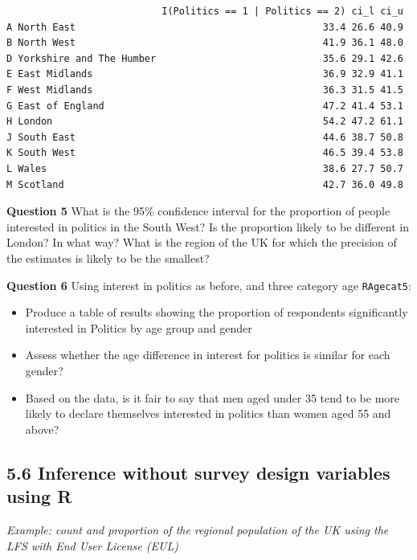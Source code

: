 \documentclass[
  14,
  a4paper,
  DIV=11,
  numbers=noendperiod]{scrartcl}
\begin{document}
\begin{verbatim}
                           I(Politics == 1 | Politics == 2) ci_l ci_u
A North East                                           33.4 26.6 40.9
B North West                                           41.9 36.1 48.0
D Yorkshire and The Humber                             35.6 29.1 42.6
E East Midlands                                        36.9 32.9 41.1
F West Midlands                                        36.3 31.5 41.5
G East of England                                      47.2 41.4 53.1
H London                                               54.2 47.2 61.1
J South East                                           44.6 38.7 50.8
K South West                                           46.5 39.4 53.8
L Wales                                                38.6 27.7 50.7
M Scotland                                             42.7 36.0 49.8
\end{verbatim}

\textbf{Question 5} What is the 95\% confidence interval for the
proportion of people interested in politics in the South West? Is the
proportion likely to be different in London? In what way? What is the
region of the UK for which the precision of the estimates is likely to
be the smallest?

\textbf{Question 6} Using interest in politics as before, and three
category age \texttt{RAgecat5}:

\begin{itemize}
\item
  Produce a table of results showing the proportion of respondents
  significantly interested in Politics by age group and gender
\item
  Assess whether the age difference in interest for politics is similar
  for each gender?
\item
  Based on the data, is it fair to say that men aged under 35 tend to be
  more likely to declare themselves interested in politics than women
  aged 55 and above?
\end{itemize}

\hypertarget{inference-without-survey-design-variables-using-r}{%
\subsection{5.6 Inference without survey design variables using
R}\label{inference-without-survey-design-variables-using-r}}

\emph{Example: count and proportion of the regional population of the UK
using the LFS with End User License (EUL)}
\end{document}
